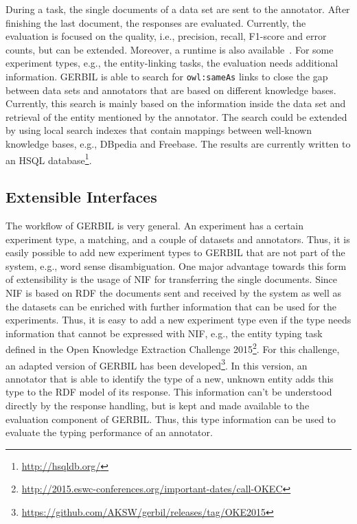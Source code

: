 During a task, the single documents of a data set are sent to the annotator.
After finishing the last document, the responses are evaluated.
Currently, the evaluation is focused on the quality, i.e., precision, recall, F1-score and error counts, but can be extended.
Moreover, a runtime is also available~\cite{GERBIL}.
For some experiment types, e.g., the entity-linking tasks, the evaluation needs additional information.
GERBIL is able to search for \texttt{owl:sameAs} links to close the gap between data sets and annotators that are based on different knowledge bases.
Currently, this search is mainly based on the information inside the data set and retrieval of the entity mentioned by the annotator.
The search could be extended by using local search indexes that contain mappings between well-known knowledge bases, e.g., DBpedia and Freebase.
The results are currently written to an HSQL database\footnote{\url{http://hsqldb.org/}}.

\subsection{Extensible Interfaces}

The workflow of GERBIL is very general.
An experiment has a certain experiment type, a matching, and a couple of datasets and annotators.
Thus, it is easily possible to add new experiment types to GERBIL that are not part of the system, e.g., word sense disambiguation.
One major advantage towards this form of extensibility is the usage of NIF for transferring the single documents.
Since NIF is based on RDF the documents sent and received by the system as well as the datasets can be enriched with further information that can be used for the experiments.
Thus, it is easy to add a new experiment type even if the type needs information that cannot be expressed with NIF, e.g., the entity typing task defined in the Open Knowledge Extraction Challenge 2015\footnote{\url{http://2015.eswc-conferences.org/important-dates/call-OKEC}}.
For this challenge, an adapted version of GERBIL has been developed\footnote{\url{https://github.com/AKSW/gerbil/releases/tag/OKE2015}}.
In this version, an annotator that is able to identify the type of a new, unknown entity adds this type to the RDF model of its response.
This information can't be understood directly by the response handling, but is kept and made available to the evaluation component of GERBIL.
Thus, this type information can be used to evaluate the typing performance of an annotator.

